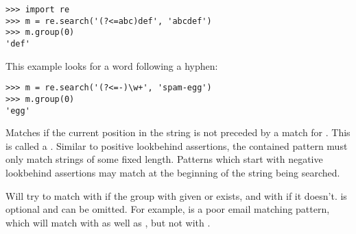 \begin{description}
\begin{verbatim}
>>> import re
>>> m = re.search('(?<=abc)def', 'abcdef')
>>> m.group(0)
'def'
\end{verbatim}

This example looks for a word following a hyphen:

\begin{verbatim}
>>> m = re.search('(?<=-)\w+', 'spam-egg')
>>> m.group(0)
'egg'
\end{verbatim}

\item[\code{(?<!...)}] Matches if the current position in the string
is not preceded by a match for .  This is called a
.  Similar to positive lookbehind
assertions, the contained pattern must only match strings of some
fixed length.  Patterns which start with negative lookbehind
assertions may match at the beginning of the string being searched.

\item[\code{(?(\var{id/name})yes-pattern|no-pattern)}] Will try to match
with  if the group with given  or 
exists, and with  if it doesn't. 
is optional and can be omitted. For example, 
 is a poor email matching
pattern, which will match with  as well as
, but not with .

\end{description}

